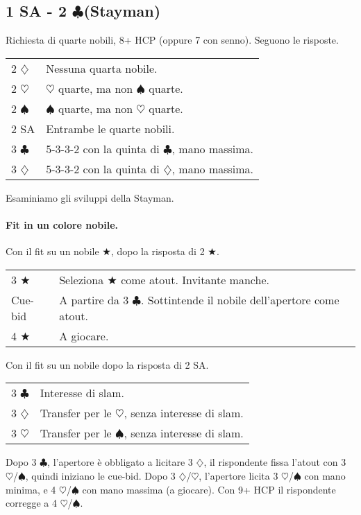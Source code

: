 \documentclass[a4paper,10pt]{article}
\renewcommand{\c}{$\clubsuit$\xspace}
\renewcommand{\d}{$\diamondsuit$\xspace}
\newcommand{\h}{$\heartsuit$\xspace}
\newcommand{\s}{$\spadesuit$\xspace}
\renewcommand{\j}{$\bigstar$\xspace}
\newcommand{\sa}{SA\xspace}
\newcommand{\smallspace}{\vskip0.3cm}
\newenvironment{twocol}
  {\smallspace\noindent\begin{tabular}{l p{0.78\textwidth}}}
  {\end{tabular}\smallspace}
\begin{document}
\subsection{1 SA - 2 \c (Stayman)}

Richiesta di quarte nobili, 8+ HCP (oppure 7 con senno). Seguono le risposte.

\begin{twocol}
	2 \d & Nessuna quarta nobile. \\
	2 \h & \h quarte, ma non \s quarte. \\
	2 \s & \s quarte, ma non \h quarte. \\
	2 \sa & Entrambe le quarte nobili. \\
	3 \c & 5-3-3-2 con la quinta di \c, mano massima. \\
	3 \d & 5-3-3-2 con la quinta di \d, mano massima. \\
\end{twocol}

\noindent Esaminiamo gli sviluppi della Stayman.

\paragraph{Fit in un colore nobile.}

Con il fit su un nobile \j, dopo la risposta di 2 \j.
\begin{twocol}
	3 \j & Seleziona \j come atout. Invitante manche. \\
	Cue-bid & A partire da 3 \c. Sottintende il nobile dell'apertore come atout. \\
	4 \j & A giocare. \\
\end{twocol}

Con il fit su un nobile dopo la risposta di 2 \sa.

\begin{twocol}
	3 \c & Interesse di slam. \\
	3 \d & Transfer per le \h, senza interesse di slam. \\
	3 \h & Transfer per le \s, senza interesse di slam. \\
\end{twocol}

Dopo 3 \c, l'apertore è obbligato a licitare 3 \d, il rispondente fissa l'atout con 3 \h/\s, quindi iniziano le cue-bid.
Dopo 3 \d/\h, l'apertore licita 3 \h/\s con mano minima, e 4 \h/\s con mano massima (a giocare). Con 9+ HCP il rispondente corregge a 4 \h/\s.
\end{document}
